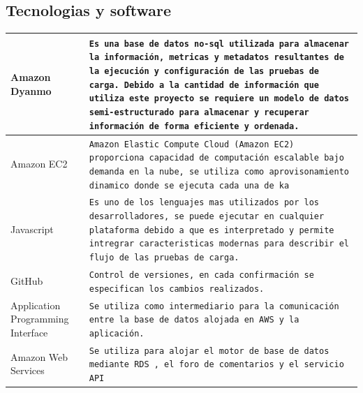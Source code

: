 \documentclass[10pt]{article}
\begin{document}
\subsection{Tecnologias y software}
\begin{table}[H]
    \centering
    \par\vspace{\baselineskip}
    \begin{tabular}{| p{5 cm}| p{11cm} |}
        \hline
        Amazon Dyanmo                     & \texttt{Es una base de datos no-sql utilizada para almacenar la información, metricas y metadatos resultantes de la ejecución y configuración de las pruebas de carga. Debido a la cantidad de información que utiliza este proyecto se requiere un modelo de datos semi-estructurado para almacenar y recuperar información de forma eficiente y ordenada.} \\ \hline
        Amazon EC2                        & \texttt{Amazon Elastic Compute Cloud (Amazon EC2) proporciona capacidad de computación escalable bajo demanda en la nube, se utiliza como aprovisonamiento dinamico donde se ejecuta cada una de ka}                                                                                                                                                         \\ \hline
        Javascript                        & \texttt{Es uno de los lenguajes mas utilizados por los desarrolladores, se puede ejecutar en cualquier plataforma debido a que es interpretado y permite intregrar caracteristicas modernas para describir el flujo de las pruebas de carga.}                                                                                                                \\ \hline
        GitHub                            & \texttt{Control de versiones, en cada confirmación se especifican los cambios realizados.}                                                                                                                                                                                                                                                                   \\ \hline
        Application Programming Interface & \texttt{Se utiliza como intermediario para la comunicación entre la base de datos alojada en AWS y la aplicación. }                                                                                                                                                                                                                                          \\ \hline
        Amazon Web Services               & \texttt{Se utiliza para alojar el motor de base de datos mediante RDS , el foro de comentarios y el servicio API }                                                                                                                                                                                                                                           \\ \hline
    \end{tabular}
\end{table}
\newpage
\end{document}
